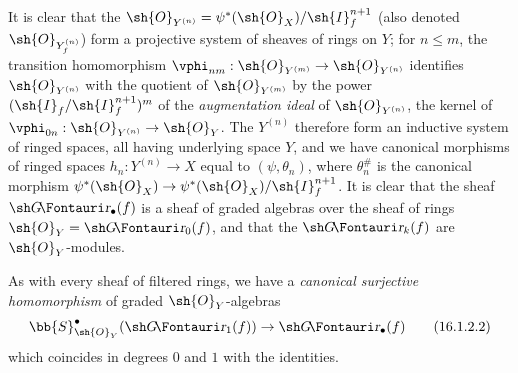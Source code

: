 It is clear that the $\sh{O}_{Y^{(n)}} = \psi^*(\sh{O}_X)/\sh{I}_f^{n+1}$ (also denoted $\sh{O}_{Y_f^{(n)}}$) form a
projective system of sheaves of rings on $Y$; for $n \leq m$, the transition homomorphism $\vphi_{nm}:\sh{O}_{Y^{(m)}} \to \sh{O}_{Y^{(n)}}$ identifies $\sh{O}_{Y^{(n)}}$ with the quotient of $\sh{O}_{Y^{(m)}}$ by the power $(\sh{I}_f/\sh{I}_f^{n+1})^m$ of the \emph{augmentation ideal} of $\sh{O}_{Y^{(n)}}$, the kernel of $\vphi_{0n}: \sh{O}_{Y^{(n)}} \to \sh{O}_{Y}$.
The $Y^{(n)}$ therefore form an inductive system of ringed spaces, all having underlying space $Y$, and we have canonical morphisms of ringed spaces $h_n: Y^{(n)} \to X$ equal to $(\psi, \theta_n)$, where $\theta^\#_n$ is the canonical morphism $\psi^*(\sh{O}_X) \to \psi^*(\sh{O}_X)/\sh{I}_f^{n+1}$.
It is clear that the sheaf $\shGr_\bullet(f)$ is a sheaf of graded algebras over the sheaf of rings $\sh{O}_Y = \shGr_0(f)$, and that the $\shGr_k(f)$ are $\sh{O}_Y$-modules.

As with every sheaf of filtered rings, we have a \emph{canonical surjective homomorphism} of graded $\sh{O}_Y$-algebras
\[
  \label{IV.16.1.2.2}
  \bb{S}_{\sh{O}_Y}^\bullet(\shGr_1(f)) \to \shGr_\bullet(f)
  \tag{16.1.2.2}
\]
which coincides in degrees $0$ and $1$ with the identities.

